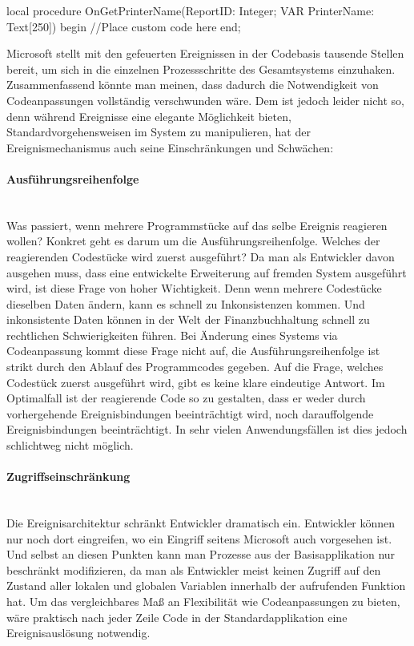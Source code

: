 \begin{program}[H]  %
	\begin{JavaCode}
  local procedure OnGetPrinterName(ReportID: Integer; VAR PrinterName: Text[250])
  begin
    //Place custom code here
  end;
	\end{JavaCode}
\end{program}

Microsoft stellt mit den gefeuerten Ereignissen in der Codebasis tausende Stellen bereit, um sich in die einzelnen Prozessschritte des Gesamtsystems einzuhaken. Zusammenfassend könnte man meinen, dass dadurch die Notwendigkeit von Codeanpassungen vollständig verschwunden wäre. Dem ist jedoch leider nicht so, denn während Ereignisse eine elegante Möglichkeit bieten, Standardvorgehensweisen im System zu manipulieren, hat der Ereignismechanismus auch seine Einschränkungen und Schwächen:

\paragraph{Ausführungsreihenfolge} \mbox{}\\
Was passiert, wenn mehrere Programmstücke auf das selbe Ereignis reagieren wollen? Konkret geht es darum um die Ausführungsreihenfolge. Welches der reagierenden Codestücke wird zuerst ausgeführt? Da man als Entwickler davon ausgehen muss, dass eine entwickelte Erweiterung auf fremden System ausgeführt wird, ist diese Frage von hoher Wichtigkeit. Denn wenn mehrere Codestücke dieselben Daten ändern, kann es schnell zu Inkonsistenzen kommen. Und inkonsistente Daten können in der Welt der Finanzbuchhaltung schnell zu rechtlichen Schwierigkeiten führen. Bei Änderung eines Systems via Codeanpassung kommt diese Frage nicht auf, die Ausführungsreihenfolge ist strikt durch den Ablauf des Programmcodes gegeben. Auf die Frage, welches Codestück zuerst ausgeführt wird, gibt es keine klare eindeutige Antwort. Im Optimalfall ist der reagierende Code so zu gestalten, dass er weder durch vorhergehende Ereignisbindungen beeinträchtigt wird, noch darauffolgende Ereignisbindungen beeinträchtigt. In sehr vielen Anwendungsfällen ist dies jedoch schlichtweg nicht möglich.

\paragraph{Zugriffseinschränkung} \mbox{}\\
Die Ereignisarchitektur schränkt Entwickler dramatisch ein. Entwickler können nur noch dort eingreifen, wo ein Eingriff seitens Microsoft auch vorgesehen ist. Und selbst an diesen Punkten kann man Prozesse aus der Basisapplikation nur beschränkt modifizieren, da man als Entwickler meist keinen Zugriff auf den Zustand aller lokalen und globalen Variablen innerhalb der aufrufenden Funktion hat. Um das vergleichbares Maß an Flexibilität wie Codeanpassungen zu bieten, wäre praktisch nach jeder Zeile Code in der Standardapplikation eine Ereignisauslösung notwendig.


